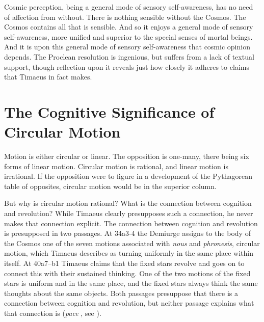 Cosmic perception, being a general mode of sensory self-awareness, has no need of affection from without. There is nothing sensible without the Cosmos. The Cosmos contains all that is sensible. And so it enjoys a general mode of sensory self-awareness, more unified and superior to the special senses of mortal beings. And it is upon this general mode of sensory self-awareness that cosmic opinion depends. The Proclean resolution is ingenious, but suffers from a lack of textual support, though reflection upon it reveals just how closely it adheres to claims that Timaeus in fact makes.


\section{The Cognitive Significance of Circular Motion} %
\label{sec:the_cognitive_significance_of_circular_motion}

Motion is either circular or linear. The opposition is one-many, there being six forms of linear motion. Circular motion is rational, and linear motion is irrational. If the opposition were to figure in a development of the Pythagorean table of opposites, circular motion would be in the superior column. 

But why is circular motion rational? What is the connection between cognition and revolution? While Timaeus clearly presupposes such a connection, he never makes that connection explicit. The connection between cognition and revolution is presupposed in two passages. At 34a3-4 the Demiurge assigns to the body of the Cosmos one of the seven motions associated with \emph{nous} and \emph{phronesis}, circular motion, which Timaeus describes as turning uniformly in the same place within itself. At 40a7--b1 Timaeus claims that the fixed stars revolve and goes on to connect this with their sustained thinking. One of the two motions of the fixed stars is uniform and in the same place, and the fixed stars always think the same thoughts about the same objects. Both passages presuppose that there is a connection between cognition and revolution, but neither passage explains what that connection is (\emph{pace} \citealt[119]{Cornford:1935fk}, see \citealt[72--3]{Lee:1976xs}).

